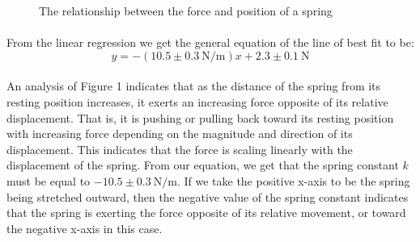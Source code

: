 \documentclass[12pt]{article}
\begin{document}
\begin{figure}[H]
    \centering

    \caption[10pt]{The relationship between the force and position of a spring}

\end{figure}

\paragraph{}

From the linear regression we get the general equation of the line of best fit to be:
\[y=-(10.5 \pm \SI{0.3}{\newton\per\metre})x + 2.3 \pm \SI{0.1}{\newton}\]

\paragraph{}

An analysis of Figure 1 indicates that as the distance of the spring from its resting position increases, it exerts an increasing force opposite of its relative displacement. That is, it is pushing or pulling back toward its resting position with increasing force depending on the magnitude and direction of its displacement. This indicates that the force is scaling linearly with the displacement of the spring. From our equation, we get that the spring constant $k$ must be equal to $-10.5 \pm \SI{0.3}{\newton\per\metre}$. If we take the positive x-axis to be the spring being stretched outward, then the negative value of the spring constant indicates that the spring is exerting the force opposite of its relative movement, or toward the negative x-axis in this case.
\end{document}
